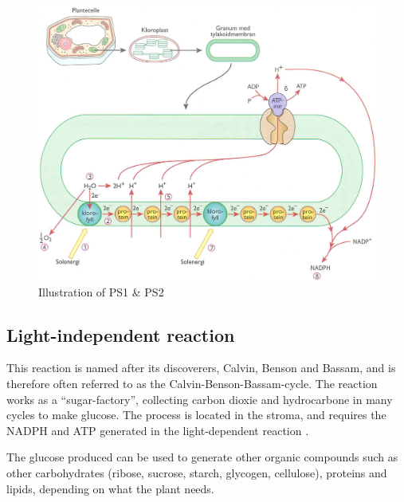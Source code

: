 \begin{figure}
\centering
\includegraphics[width=\textwidth]{img/photosynthesis/light_dependent.png}
\caption{Illustration of PS1 \& PS2 \citep{bios}}
\label{fig:photosystem}
\end{figure}

\subsection{Light-independent reaction}
This reaction is named after its discoverers, Calvin, Benson and Bassam, and is therefore often referred to as the Calvin-Benson-Bassam-cycle. The reaction works as a “sugar-factory”, collecting carbon dioxie and hydrocarbone in many cycles to make glucose. The process is located in the stroma, and requires the NADPH and ATP generated in the light-dependent reaction \citep{bi2}. 

The glucose produced can be used to generate other organic compounds such as other carbohydrates (ribose, sucrose, starch, glycogen, cellulose), proteins and lipids, depending on what the plant needs.

